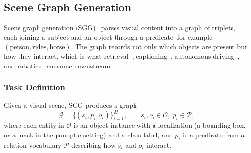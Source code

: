 

\subsection{Scene Graph Generation}
\label{sec:scene_graph_generation}


Scene graph generation (SGG)~\cite{xu2017scene,chang2021comprehensive,li2024scene} parses visual content into a graph of triplets, each joining a subject and an object through a predicate, for example $(\text{person}, \text{rides}, \text{horse})$.
The graph records not only which objects are present but how they interact, which is what retrieval~\cite{johnson2015image,miao2024scenegraphloc}, captioning~\cite{zhong2020comprehensive,lu2025benchmarking}, autonomous driving~\cite{zhou2022toward,liu2023learning,malawade2022roadscene2vec}, and robotics~\cite{nguyen2025generating,werby2024hierarchical,garg2024robohop} consume downstream.


\subsubsection{Task Definition}
Given a visual scene, SGG produces a graph
\begin{equation}
\mathcal{G} = \{(s_i, p_i, o_i)\}_{i=1}^{M}, \qquad s_i, o_i \in \mathcal{O},\; p_i \in \mathcal{P},
\end{equation}
where each entity in $\mathcal{O}$ is an object instance with a localization (a bounding box, or a mask in the panoptic setting) and a class label, and $p_i$ is a predicate from a relation vocabulary $\mathcal{P}$ describing how $s_i$ and $o_i$ interact.


